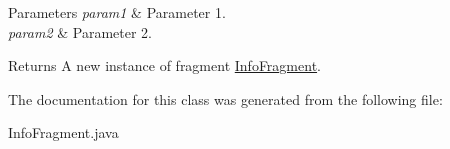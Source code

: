 \begin{DoxyParams}{\-Parameters}
{\em param1} & \-Parameter 1. \\
\hline
{\em param2} & \-Parameter 2. \\
\hline
\end{DoxyParams}
\begin{DoxyReturn}{\-Returns}
\-A new instance of fragment \hyperlink{classcom_1_1example_1_1sel_1_1lostfound_1_1InfoFragment}{\-Info\-Fragment}. 
\end{DoxyReturn}


\-The documentation for this class was generated from the following file\-:\begin{DoxyCompactItemize}
\item 
\-Info\-Fragment.\-java\end{DoxyCompactItemize}
